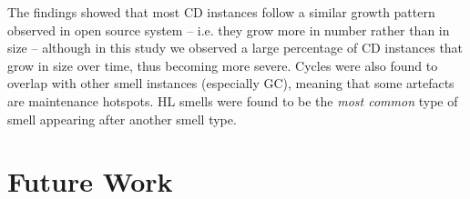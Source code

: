 The findings showed that most CD instances follow a similar growth pattern observed in open source system -- i.e. they grow more in number rather than in size -- although in this study we observed a large percentage of CD instances that grow in size over time, thus becoming more severe.
Cycles were also found to overlap with other smell instances (especially GC), meaning that some artefacts are maintenance hotspots.
HL smells were found to be the \emph{most common} type of smell appearing after another smell type.




\section{Future Work}



